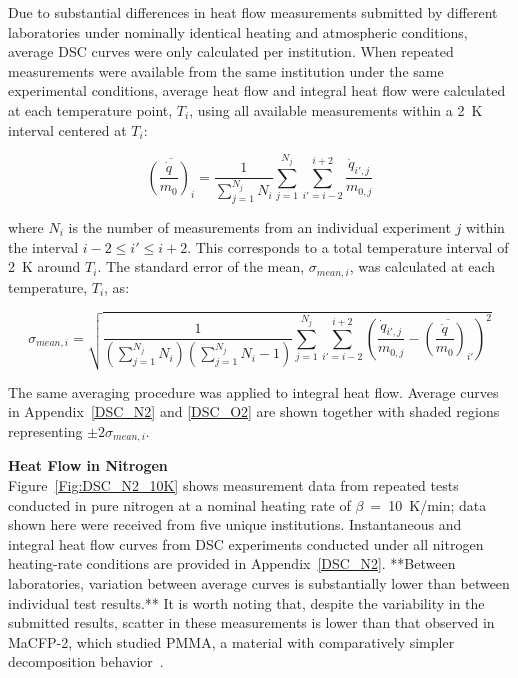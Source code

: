 \documentclass{book}
\begin{document}
Due to substantial differences in heat flow measurements submitted by different laboratories under nominally identical heating and atmospheric conditions, average DSC curves were only calculated per institution. When repeated measurements were available from the same institution under the same experimental conditions, average heat flow and integral heat flow were calculated at each temperature point, $T_i$, using all available measurements within a 2~K interval centered at $T_i$:

\begin{equation}
\overline{\left(\frac{\dot{q}}{m_0}\right)_i}=\frac{1}{\sum_{j=1}^{N_j}N_{i}}\sum_{j=1}^{N_j}\sum_{i'=i-2}^{i+2}\frac{\dot{q}_{i',j}}{m_{0,j}}
\end{equation}

where $N_{i}$ is the number of measurements from an individual experiment $j$ within the interval $i-2 \leq i' \leq i+2$. This corresponds to a total temperature interval of 2~K around $T_i$. The standard error of the mean, $\sigma_{mean,i}$, was calculated at each temperature, $T_i$, as:

\begin{equation}
\sigma_{mean,i}=\sqrt{\frac{1}{\left(\sum_{j=1}^{N_j}N_{i}\right)\left(\sum_{j=1}^{N_j}N_{i}-1\right)}\sum_{j=1}^{N_j}\sum_{i'=i-2}^{i+2}\left(\frac{\dot{q}_{i',j}}{m_{0,j}}-\overline{\left(\frac{\dot{q}}{m_0}\right)_{i'}}\right)^2}
\end{equation}

The same averaging procedure was applied to integral heat flow. Average curves in Appendix~\ref{DSC_N2} and \ref{DSC_O2} are shown together with shaded regions representing $\pm 2\sigma_{mean,i}$.

\textbf{Heat Flow in Nitrogen} \\
Figure~\ref{Fig:DSC_N2_10K} shows measurement data from repeated tests conducted in pure nitrogen at a nominal heating rate of $\beta$~=~10~K/min; data shown here were received from five unique institutions. Instantaneous and integral heat flow curves from DSC experiments conducted under all nitrogen heating-rate conditions are provided in Appendix~\ref{DSC_N2}. **Between laboratories, variation between average curves is substantially lower than between individual test results.** It is worth noting that, despite the variability in the submitted results, scatter in these measurements is lower than that observed in MaCFP-2, which studied PMMA, a material with comparatively simpler decomposition behavior~\cite{PreliminarySummary}.
\end{document}
